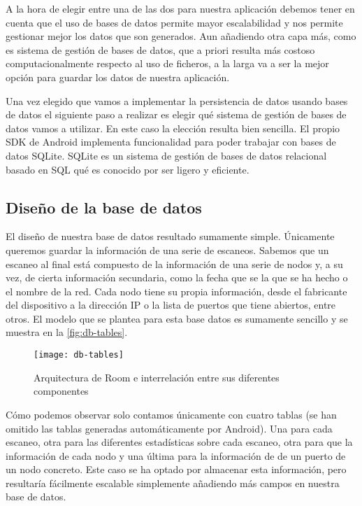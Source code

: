 A la hora de elegir entre una de las dos para nuestra aplicación debemos tener en cuenta que el uso de bases de datos permite mayor escalabilidad y nos permite gestionar mejor los datos que son generados. Aun añadiendo otra capa más, como es sistema de gestión de bases de datos, que a priori resulta más costoso computacionalmente respecto al uso de ficheros, a la larga va a ser la mejor opción para guardar los datos de nuestra aplicación.

Una vez elegido que vamos a implementar la persistencia de datos usando bases de datos el siguiente paso a realizar es  elegir qué sistema de gestión de bases de datos vamos a utilizar. En este caso la elección resulta bien sencilla. El propio SDK de Android implementa funcionalidad para poder trabajar con bases de datos SQLite. SQLite es un sistema de gestión de bases de datos relacional basado en SQL qué es conocido por ser ligero y eficiente.

\subsection{Diseño de la base de datos}

El diseño de nuestra base de datos resultado sumamente simple. Únicamente queremos guardar la información de una serie de escaneos. Sabemos que un escaneo al final está compuesto de la información de una serie de nodos y, a su vez, de cierta información secundaria, como la fecha que se la que se ha hecho o el nombre de la red. Cada nodo tiene su propia información, desde el fabricante del dispositivo a la dirección IP o la lista de puertos que tiene abiertos, entre otros. El modelo que se plantea para esta base datos es sumamente sencillo y se muestra en la \autoref{fig:db-tables}.

\begin{figure}[ht]
	\centering
	\texttt{[image: db-tables]}
	\caption{Arquitectura de Room e interrelación entre sus diferentes componentes}
	\label{fig:db-tables}
\end{figure}

Cómo podemos observar solo contamos únicamente con cuatro tablas (se han omitido las tablas generadas automáticamente por Android). Una para cada escaneo, otra para las diferentes estadísticas sobre cada escaneo, otra para que la información de cada nodo y una última para la información de de un puerto de un nodo concreto. Este caso se ha optado por almacenar esta información, pero resultaría fácilmente escalable simplemente añadiendo más campos en nuestra base de datos.

